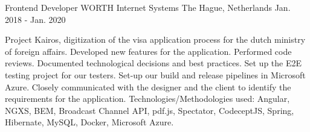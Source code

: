 

\begin{cventries}

  \cventry
    {Frontend Developer} %
    {WORTH Internet Systems} %
    {The Hague, Netherlands} %
    {Jan. 2018 - Jan. 2020} %
    {
      \begin{cvitems} %
          \item {
          	  Project Kairos, digitization of the visa application process for the dutch ministry of foreign affairs.
   		  	  \newline
   		  	  Developed new features for the application.
   		  	  \newline
   		  	  Performed code reviews.
   		  	  \newline
 		  	  Documented technological decisions and best practices.
   		  	  \newline
   		  	  Set up the E2E testing project for our testers.
   		  	  \newline
   		  	  Set-up our build and release pipelines in Microsoft Azure.
   		  	  \newline
    		  Closely communicated with the designer and the client to identify the requirements for the application.
    		  \newline
  			  Technologies/Methodologies used: Angular, NGXS, BEM, Broadcast Channel API, pdf.js, Spectator, CodeceptJS, Spring, Hibernate, MySQL, Docker, Microsoft Azure.
     	  }
      \end{cvitems}
    }


\end{cventries}
